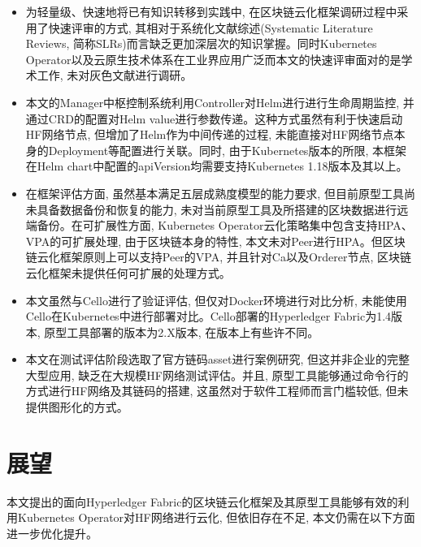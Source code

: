 \begin{itemize}[itemindent=2em]
    \item 为轻量级、快速地将已有知识转移到实践中, 在区块链云化框架调研过程中采用了快速评审的方式, 其相对于系统化文献综述(Systematic Literature Reviews, 简称SLRs)而言缺乏更加深层次的知识掌握。同时Kubernetes Operator以及云原生技术体系在工业界应用广泛而本文的快速评审面对的是学术工作, 未对灰色文献进行调研。

    \item 本文的Manager中枢控制系统利用Controller对Helm进行进行生命周期监控, 并通过CRD的配置对Helm value进行参数传递。这种方式虽然有利于快速启动HF网络节点, 但增加了Helm作为中间传递的过程, 未能直接对HF网络节点本身的Deployment等配置进行关联。同时, 由于Kubernetes版本的所限, 本框架在Helm chart中配置的apiVersion均需要支持Kubernetes 1.18版本及其以上。

    \item 在框架评估方面, 虽然基本满足五层成熟度模型的能力要求, 但目前原型工具尚未具备数据备份和恢复的能力, 未对当前原型工具及所搭建的区块数据进行远端备份。在可扩展性方面, Kubernetes Operator云化策略集中包含支持HPA、VPA的可扩展处理, 由于区块链本身的特性, 本文未对Peer进行HPA。但区块链云化框架原则上可以支持Peer的VPA, 并且针对Ca以及Orderer节点, 区块链云化框架未提供任何可扩展的处理方式。

    \item 本文虽然与Cello进行了验证评估, 但仅对Docker环境进行对比分析, 未能使用Cello在Kubernetes中进行部署对比。Cello部署的Hyperledger Fabric为1.4版本, 原型工具部署的版本为2.X版本, 在版本上有些许不同。

    \item 本文在测试评估阶段选取了官方链码asset进行案例研究, 但这并非企业的完整大型应用, 缺乏在大规模HF网络测试评估。并且, 原型工具能够通过命令行的方式进行HF网络及其链码的搭建, 这虽然对于软件工程师而言门槛较低, 但未提供图形化的方式。

\end{itemize}



\section{展望}

本文提出的面向Hyperledger Fabric的区块链云化框架及其原型工具能够有效的利用Kubernetes Operator对HF网络进行云化, 但依旧存在不足, 本文仍需在以下方面进一步优化提升。

